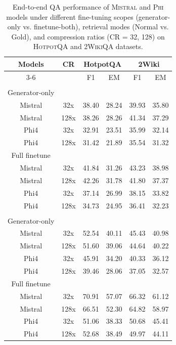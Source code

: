 \documentclass{applemlr}
\numberwithin{equation}{section}
\begin{document}
\begin{table}[H]
\scriptsize
\centering
\begin{tabular}{c|c|cc|cc}
\hline
\multirow{2}{*}{Models} & \multirow{2}{*}{CR} 
& \multicolumn{2}{c|}{HotpotQA}
& \multicolumn{2}{c}{2Wiki}
\\
\cline{3-6}
& &  F1 & EM
  & F1 & EM
 \\
\hline
\rowcolor{gray!15}
\multicolumn{6}{c}{\textbf{Normal}} \\
Generator-only \\
\hline 

Mistral  & 32x  &38.40&28.24&39.93&35.80\\
Mistral & 128x &38.26&28.26&41.34&37.29\\
Phi4  & 32x  &32.91&23.51&35.99&32.14\\
Phi4 & 128x &31.42&21.89&35.54&31.32\\
\hline 
Full finetune \\
\hline 
Mistral& 32x &    41.84 & 31.26 & 43.23 & 38.98  \\
Mistral& 128x & 42.26 & 31.78 & 41.80 & 37.37 \\
 Phi4& 32x &    37.14 & 26.99 & 38.15 & 33.82 \\
Phi4& 128x &   34.73 & 24.95 &36.41 & 32.23 \\

\hline 
\rowcolor{gray!15}
\multicolumn{6}{c}{\textbf{Oracle}} \\
Generator-only \\
\hline 

Mistral  & 32x  & 52.54&40.11&45.43&40.98\\
Mistral & 128x & 51.60&39.06&44.64&40.22\\


Phi4  & 32x &45.91&34.20& 40.33&36.12\\
Phi4 & 128x &39.46&28.06&37.05&32.57 \\
\hline 
Full finetune \\
\hline 
Mistral & 32x &    70.91 & 57.07 & 66.32 & 61.12 \\
 Mistral& 128x &   66.51 & 52.30 & 64.82 & 58.97 \\
Phi4 & 32x &    51.06 & 38.33 &  50.68 & 45.41  \\
Phi4 &  128x&   52.68 & 38.49 &  49.97 & 44.11  \\
\toprule
    \end{tabular}
    \caption{End-to-end QA performance of \textsc{Mistral} and \textsc{Phi} models 
under different fine-tuning scopes (generator-only vs. finetune-both), 
retrieval modes (Normal vs. Gold), and compression ratios (CR = 32, 128) 
on \textsc{HotpotQA} and \textsc{2WikiQA} datasets.
}
\label{generator-only-end-to-end}
    
\end{table}
\end{document}
